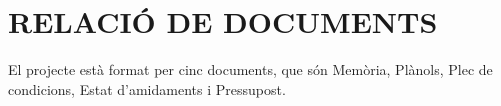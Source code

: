 \chapter{\uppercase{Relació de documents}}
El projecte està format per cinc documents, que són Memòria, Plànols, Plec de condicions, Estat d'amidaments i Pressupost.

\clearpage